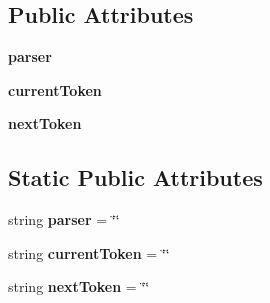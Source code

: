 \subsection*{Public Attributes}
\begin{DoxyCompactItemize}
\item 
\hypertarget{classcheshire3_1_1cql_parser_1_1_c_q_l_parser_ae882103032f3239508ea6fa13e264741}{{\bfseries parser}}\label{classcheshire3_1_1cql_parser_1_1_c_q_l_parser_ae882103032f3239508ea6fa13e264741}

\item 
\hypertarget{classcheshire3_1_1cql_parser_1_1_c_q_l_parser_a2e10e42cb8608d887a722aa4525cc79b}{{\bfseries current\-Token}}\label{classcheshire3_1_1cql_parser_1_1_c_q_l_parser_a2e10e42cb8608d887a722aa4525cc79b}

\item 
\hypertarget{classcheshire3_1_1cql_parser_1_1_c_q_l_parser_aa87bc5ddf49f776687d487b72c9e7cae}{{\bfseries next\-Token}}\label{classcheshire3_1_1cql_parser_1_1_c_q_l_parser_aa87bc5ddf49f776687d487b72c9e7cae}

\end{DoxyCompactItemize}
\subsection*{Static Public Attributes}
\begin{DoxyCompactItemize}
\item 
\hypertarget{classcheshire3_1_1cql_parser_1_1_c_q_l_parser_a1960a9cee022dc31875d932564846c8c}{string {\bfseries parser} = \char`\"{}\char`\"{}}\label{classcheshire3_1_1cql_parser_1_1_c_q_l_parser_a1960a9cee022dc31875d932564846c8c}

\item 
\hypertarget{classcheshire3_1_1cql_parser_1_1_c_q_l_parser_a67fcc553aff3fb0c2d23319bdbbabe4a}{string {\bfseries current\-Token} = \char`\"{}\char`\"{}}\label{classcheshire3_1_1cql_parser_1_1_c_q_l_parser_a67fcc553aff3fb0c2d23319bdbbabe4a}

\item 
\hypertarget{classcheshire3_1_1cql_parser_1_1_c_q_l_parser_a3e7e4679ba927ade14e0cf7a83b3daf4}{string {\bfseries next\-Token} = \char`\"{}\char`\"{}}\label{classcheshire3_1_1cql_parser_1_1_c_q_l_parser_a3e7e4679ba927ade14e0cf7a83b3daf4}

\end{DoxyCompactItemize}


